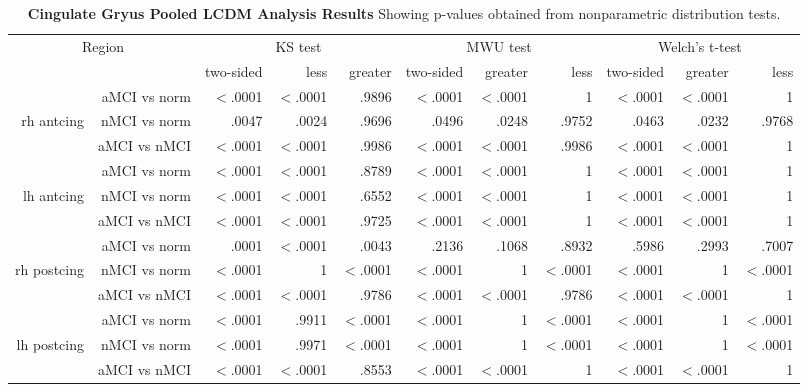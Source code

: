 \documentclass[12pt]{article}
\newcommand\T{\rule{0pt}{2.6ex}}
\newcommand\B{\rule[-1.2ex]{0pt}{0pt}}
\begin{document}
\newpage
\begin{sidewaystable}
	\centering
	\footnotesize
	\begin{tabular}{rr|rrr|rrr|rrr}
		\hline
		\multicolumn{2}{c|}{Region} \T\B & \multicolumn{3}{c|}{KS test} & \multicolumn{3}{c|}{MWU test} & \multicolumn{3}{c}{Welch's t-test} \\
		& & two-sided & less & greater & two-sided & greater & less & two-sided & greater & less \\ \hline
		& aMCI vs norm\T &  $<$.0001 & $<$.0001 & .9896 &  $<$.0001 & $<$.0001 & 1 &  $<$.0001 & $<$.0001 & 1 \\
		rh antcing & nMCI vs norm & .0047 & .0024 & .9696 & .0496 & .0248 & .9752 & .0463 & .0232 & .9768 \\
		& aMCI vs nMCI & $<$.0001 & $<$.0001 & .9986 & $<$.0001 & $<$.0001 & .9986 & $<$.0001 & $<$.0001 & 1 \\ \hline
		& aMCI vs norm\T & $<$.0001 & $<$.0001 & .8789 & $<$.0001 & $<$.0001 & 1 & $<$.0001 & $<$.0001 & 1 \\
		lh antcing & nMCI vs norm & $<$.0001 & $<$.0001 & .6552 & $<$.0001 & $<$.0001 & 1 & $<$.0001 & $<$.0001 & 1 \\
		& aMCI vs nMCI & $<$.0001 & $<$.0001 & .9725 & $<$.0001 & $<$.0001 & 1 & $<$.0001 & $<$.0001 & 1 \\ \hline
		& aMCI vs norm\T & .0001 & $<$.0001 & .0043 & .2136 & .1068 & .8932 & .5986 & .2993 & .7007 \\
		rh postcing & nMCI vs norm & $<$.0001 & 1 & $<$.0001 & $<$.0001 & 1 & $<$.0001 & $<$.0001 & 1 & $<$.0001 \\
		& aMCI vs nMCI & $<$.0001 & $<$.0001 & .9786 & $<$.0001 & $<$.0001 & .9786 & $<$.0001 & $<$.0001 & 1 \\ \hline
		& aMCI vs norm\T & $<$.0001 & .9911 & $<$.0001 & $<$.0001 & 1 & $<$.0001  & $<$.0001 & 1 & $<$.0001  \\
		lh postcing & nMCI vs norm & $<$.0001 & .9971 & $<$.0001 & $<$.0001 & 1 & $<$.0001 & $<$.0001 & 1 & $<$.0001 \\
		& aMCI vs nMCI & $<$.0001 & $<$.0001 & .8553 & $<$.0001 & $<$.0001 & 1 & $<$.0001 & $<$.0001 & 1 \\
	\end{tabular}
	\caption{\textbf{Cingulate Gryus Pooled LCDM Analysis Results}   Showing p-values obtained from nonparametric distribution tests.}
	\label{Wave1.cing.nonpara}
\end{sidewaystable}
\end{document}
